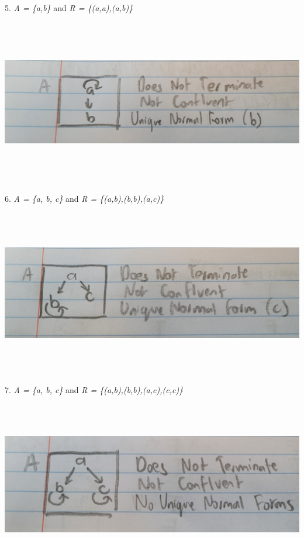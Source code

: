 \documentclass{article}
\theoremstyle{theorem}
\theoremstyle{definition}
\theoremstyle{remark}
\begin{document}
\\5. \textit{A = \{a,b\}} and \textit{R = \{(a,a),(a,b)\}}
\\ \includegraphics[width=15cm, height=8cm]{Report Images/week7_5.jpg}
\\6. \textit{A = \{a, b, c\}} and \textit{R = \{(a,b),(b,b),(a,c)\}}
\\ \includegraphics[width=15cm, height=8cm]{Report Images/week7_6.jpg}
\\7. \textit{A = \{a, b, c\}} and \textit{R = \{(a,b),(b,b),(a,c),(c,c)\}}
\\ \includegraphics[width=15cm, height=8cm]{Report Images/week7_7.jpg}
\end{document}
